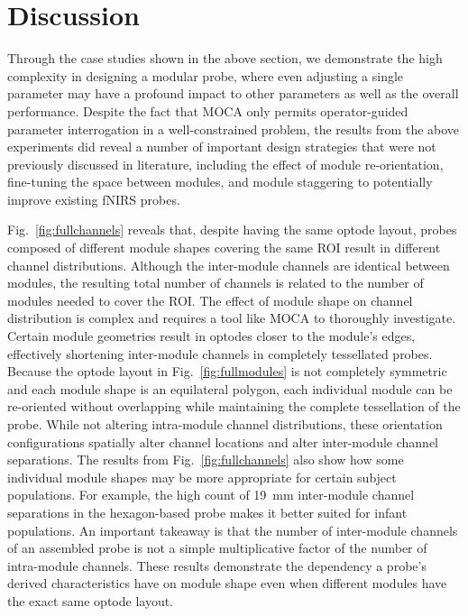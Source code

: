 \section{Discussion}
\label{sec:discussion}
Through the case studies shown in the above section, we demonstrate the high complexity in designing a modular probe, where even adjusting a single parameter may have a profound impact to other parameters as well as the overall performance. Despite the fact that \ac{MOCA} only permits operator-guided parameter interrogation in a well-constrained problem, the results from the above experiments did reveal a number of important design strategies that were not previously discussed in literature, including the effect of module re-orientation, fine-tuning the space between modules, and module staggering to potentially improve existing \ac{fNIRS} probes.

Fig.~\ref{fig:fullchannels} reveals that, despite having the same optode layout, probes composed of different module shapes covering the same \ac{ROI} result in different channel distributions. Although the inter-module channels are identical between modules, the resulting total number of channels is related to the number of modules needed to cover the \ac{ROI}. The effect of module shape on channel distribution is complex and requires a tool like \ac{MOCA} to thoroughly investigate. Certain module geometries result in optodes closer to the module's edges, effectively shortening inter-module channels in completely tessellated probes. Because the optode layout in Fig.~\ref{fig:fullmodules} is not completely symmetric and each module shape is an equilateral polygon, each individual module can be re-oriented without overlapping while maintaining the complete tessellation of the probe. While not altering intra-module channel distributions, these orientation configurations spatially alter channel locations and alter inter-module channel separations. The results from Fig.~\ref{fig:fullchannels} also show how some individual module shapes may be more appropriate for certain subject populations. For example, the high count of 19~mm inter-module channel separations in the hexagon-based probe makes it better suited for infant populations. An important takeaway is that the number of inter-module channels of an assembled probe is not a simple multiplicative factor of the number of intra-module channels. These results demonstrate the dependency a probe's derived characteristics have on module shape even when different modules have the exact same optode layout. 

